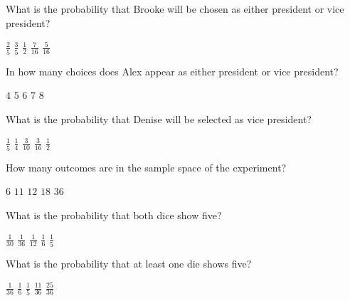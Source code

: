 \documentclass[answers,12pt]{exam}
\begin{document}
\begin{questions}
\question
What is the probability that Brooke will be chosen
as either president or vice president?\\
\begin{oneparchoices}
\choice $\frac{2}{5}$ %
\correctchoice $\frac{3}{5}$
\choice $\frac{1}{2}$ %
\choice $\frac{7}{16}$ %
\choice $\frac{5}{16}$ %
\end{oneparchoices}

\question
In how many choices does Alex appear as either president
or vice president?\\
\begin{oneparchoices}
\correctchoice $4$
\choice $5$ %
\choice $6$ %
\choice $7$
\choice $8$
\end{oneparchoices}

\question\label{LastPresident}
What is the probability that Denise will be selected
as vice president?\\
\begin{oneparchoices}
\correctchoice $\frac{1}{5}$
\choice $\frac{1}{4}$ %
\choice $\frac{3}{10}$ %
\choice $\frac{3}{16}$ %
\choice $\frac{1}{2}$ %
\end{oneparchoices}


\question\label{FirstDice}
How many outcomes are in the sample space of the experiment?\\
\begin{oneparchoices}
\choice $6$ %
\choice $11$ %
\choice $12$ %
\choice $18$
\correctchoice $36$
\end{oneparchoices}

\question What is the probability that both dice show five?\\
\begin{oneparchoices}
\choice $\frac{1}{30}$ %
\correctchoice $\frac{1}{36}$
\choice $\frac{1}{12}$ %
\choice $\frac{1}{6}$
\choice $\frac{1}{5}$ %
\end{oneparchoices}

\question\label{LastDice}
What is the probability that at least one die shows five?\\
\begin{oneparchoices}
\choice $\frac{1}{36}$
\choice $\frac{1}{6}$
\choice $\frac{1}{5}$ %
\correctchoice $\frac{11}{36}$
\choice $\frac{25}{36}$ %
\end{oneparchoices}

\end{questions}
\end{document}
